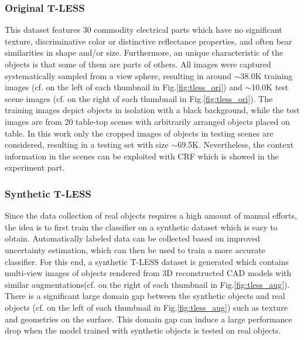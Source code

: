 

\subsubsection{Original T-LESS\cite{hodan2017tless}} \label{tless}
This dataset features 30 commodity electrical parts which have no significant texture, discriminative color or distinctive reflectance properties, and often bear similarities in shape and/or size.
Furthermore, an unique characteristic of the objects is that some of them are parts of others.
All images were captured systematically sampled from a view sphere, resulting in around $\sim$38.0K training images (cf. on the left of each thumbnail in Fig.\ref{fig:tless_ori}) and $\sim$10.0K test scene images (cf. on the right of each thumbnail in Fig.\ref{fig:tless_ori}).
The training images depict objects in isolation with a black background, while the test images are from 20 table-top scenes with arbitrarily arranged objects placed on table.
In this work only the cropped images of objects in testing scenes are considered, resulting in a testing set with size $\sim$69.5K.
Nevertheless, the context information in the scenes can be exploited with CRF  which is showed in the experiment part.

\subsubsection{Synthetic T-LESS}
Since the data collection of real objects requires a high amount of manual efforts, the idea is to first train the classifier on a synthetic dataset which is easy to obtain.
Automatically labeled data can be collected based on improved uncertainty estimation, which can then be used to train a more accurate classifier. 
For this end, a synthetic T-LESS dataset is generated which contains multi-view images of objects rendered from 3D reconstructed CAD models with similar augmentations(cf. on the right of each thumbnail in Fig.\ref{fig:tless_aug}).
There is a significant large domain gap between the synthetic objects and real objects (cf. on the left of each thumbnail in Fig.\ref{fig:tless_aug}) such as texture and geometries on the surface.
This domain gap can induce a large performance drop when the model trained with synthetic objects is tested on real objects.

